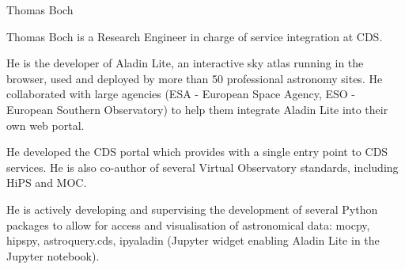 \begin{participant}[type=R,PM=2,gender=male]{Thomas Boch}




  \par Thomas Boch is a Research Engineer in charge of service integration at CDS.

  \par He is the developer of Aladin Lite, an interactive sky atlas running in the browser, used and deployed by more than 50 professional astronomy sites. He collaborated with large agencies (ESA - European Space Agency, ESO - European Southern Observatory) to help them integrate Aladin Lite into their own web portal.

  \par He developed the CDS portal which provides with a single entry point to CDS services. He is also co-author of several Virtual Observatory standards, including HiPS and MOC.

  \par He is actively developing and supervising the development of several Python packages to allow for access and visualisation of astronomical data: mocpy, hipspy, astroquery.cds, ipyaladin (Jupyter widget enabling Aladin Lite in the Jupyter notebook).


\end{participant}

